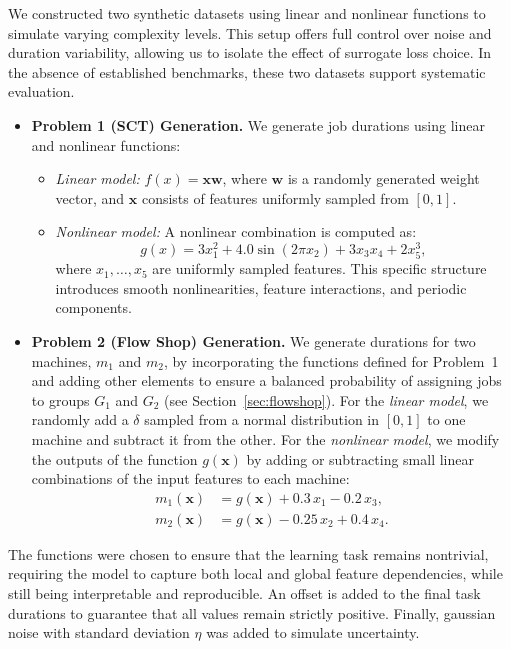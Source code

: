 \documentclass{article}
\begin{document}
We constructed two synthetic datasets using linear and nonlinear functions to simulate varying complexity levels.
This setup offers full control over noise and duration variability, allowing us to isolate the effect of surrogate loss choice.
In the absence of established benchmarks, these two datasets support systematic evaluation.
\begin{itemize}
    \item \textbf{Problem 1 (SCT) Generation.} We generate job durations using linear and nonlinear functions:
    \begin{itemize}
        \item \emph{Linear model:} \( f(x) = \mathbf{xw} \), where \(\mathbf{w}\) is a randomly generated weight vector, and \(\mathbf{x}\) consists of features uniformly sampled from \([0, 1]\).
        \item \emph{Nonlinear model:} A nonlinear combination is computed as:
        \[
        g(x) = 3x_1^2 + 4.0\sin(2\pi x_2) + 3x_3x_4 + 2x_5^3,
        \]
        where \(x_1, \dots, x_5\) are uniformly sampled features.
        This specific structure introduces smooth nonlinearities, feature interactions, and periodic components.
    \end{itemize}

    \item \textbf{Problem 2 (Flow Shop) Generation.} 
    We generate durations for two machines, $m_1$ and $m_2$, by incorporating the functions defined for Problem~1 and adding other elements to ensure a balanced probability of assigning jobs to groups $G_1$ and $G_2$ (see Section~\ref{sec:flowshop}). 
    For the \emph{linear model}, we randomly add a $\delta$ sampled from a normal distribution in $[0,1]$ to one machine and subtract it from the other. 
    For the \emph{nonlinear model}, we modify the outputs of the function $g(\mathbf{x})$ by adding or subtracting small linear combinations of the input features to each machine:
        \[
        \begin{aligned}
        m_1(\mathbf{x}) &= g(\mathbf{x}) + 0.3\, x_1 - 0.2\, x_3, \\
        m_2(\mathbf{x}) &= g(\mathbf{x}) - 0.25\, x_2 + 0.4\, x_4 .
        \end{aligned}
        \]
\end{itemize} The functions were chosen to ensure that the learning task remains nontrivial, requiring the model to capture both local and global feature dependencies, while still being interpretable and reproducible.
An offset is added to the final task durations to guarantee that all values remain strictly positive. Finally, gaussian noise with standard deviation $\eta$ was added to simulate uncertainty.
\end{document}
